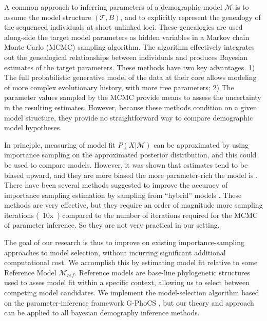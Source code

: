 \documentclass[11pt]{article}
\newcommand{\M}{\mathcal{M}}
\newcommand{\Tr}{\mathcal{T}}
\newcommand{\Mref}{\M_{ref}}
\newcommand{\1}{\mathbbm{1}}
\newcommand{\gp}{G-PhoCS }
\begin{document}
A common approach to inferring parameters of a demographic model $\M$ is to assume the model structure $(\Tr,B)$, and to explicitly represent the genealogy of the sequenced individuals at short unlinked loci.
%
These genealogies are used along-side the target model parameters as hidden variables in a Markov chain Monte Carlo (MCMC) sampling algorithm. 
%
The algorithm effectively integrates out the genealogical relationships between individuals and produces Bayesian estimates of the target parameters.
%
These methods have two key advantages. 1) The full probabilistic generative model of the data at their core allows modeling of more complex evolutionary history, with more free parameters; 2) The parameter values sampled by the MCMC provide means to assess the uncertainty in the resulting estimates.
%
However, because these methods condition on a given model structure, they provide no straightforward way to compare demographic model hypotheses.


In principle, measuring of model fit $P(X|\M)$ can be approximated by using importance sampling on the approximated posterior distribution, and this could be used to compare models.
%
However, it was shown that estimates tend to be biased upward, and they are more biased the more parameter-rich the model is \citep{XIEETAL11}. 
%
There have been several methods suggested to improve the accuracy of importance sampling estimation by sampling from ``hybrid'' models \citep{LARTPHIL06,XIEETAL11}.
%
These methods are very effective, but they require an order of magnitude more sampling iterations (~10x~) compared to the number of iterations required for the MCMC of parameter inference. So they are not very practical in our setting.


The goal of our research is thus to improve on existing importance-sampling approaches to model selection, without incurring significant additional computational cost.
%
We accomplish this by estimating model fit relative to some Reference Model $\Mref$. Reference models are base-line phylogenetic structures used to asses model fit within a specific context, allowing us to select between competing model candidates.
%
We implement the model-selection algorithm based on the parameter-inference framework \gp, but our theory and approach can be applied to all bayesian demography inference methods.
\end{document}
